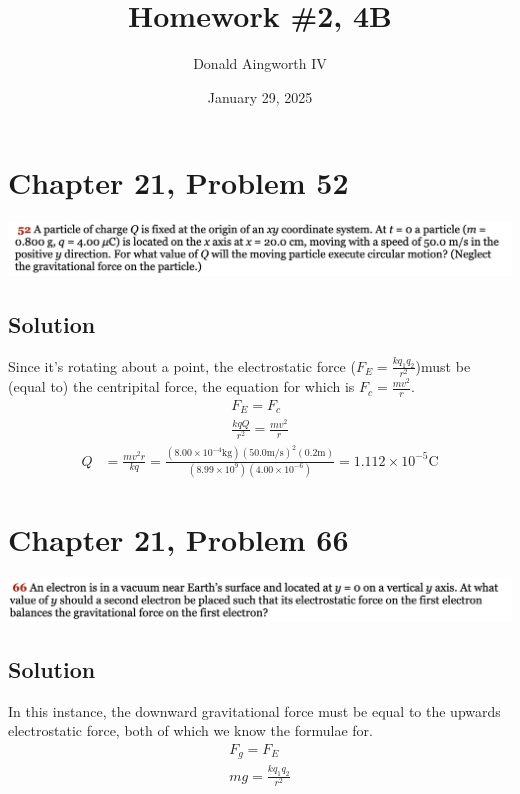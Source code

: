 \documentclass[12pt]{article}
\title{Homework \#2, 4B}
\author{Donald Aingworth IV}
\date{January 29, 2025}
\begin{document}

\maketitle

\pagebreak
\section*{Chapter 21, Problem 52}
\includegraphics[width=\textwidth]{picture_1.png}

\subsection*{Solution}
Since it's rotating about a point, the electrostatic force ($F_E = \frac{kq_1 q_2}{r^2}$)must be (equal to) the centripital force, the equation for which is $F_c = \frac{mv^2}{r}$. 
\begin{gather*}
    F_E = F_c\\
    \frac{kqQ}{r^2} = \frac{mv^2}{r}
\end{gather*}
\begin{align*}
    Q   &=  \frac{mv^2r}{kq}
        =   \frac{(8.00 \times 10^{-4} \unit{\kilo\gram})(50.0\unit{\meter/\second})^2(0.2\unit{\meter})}{(8.99 \times 10^{9})(4.00 \times 10^{-6})}
        =   \boxed{1.112 \times 10^{-5} \unit{\coulomb}}
\end{align*}

\pagebreak
\section*{Chapter 21, Problem 66}
\includegraphics[width=\textwidth]{picture_2.png}

\subsection*{Solution}
In this instance, the downward gravitational force must be equal to the upwards electrostatic force, both of which we know the formulae for.
\begin{gather*}
    F_g = F_E\\
    mg = \frac{kq_1 q_2}{r^2}
\end{gather*}
\end{document}
